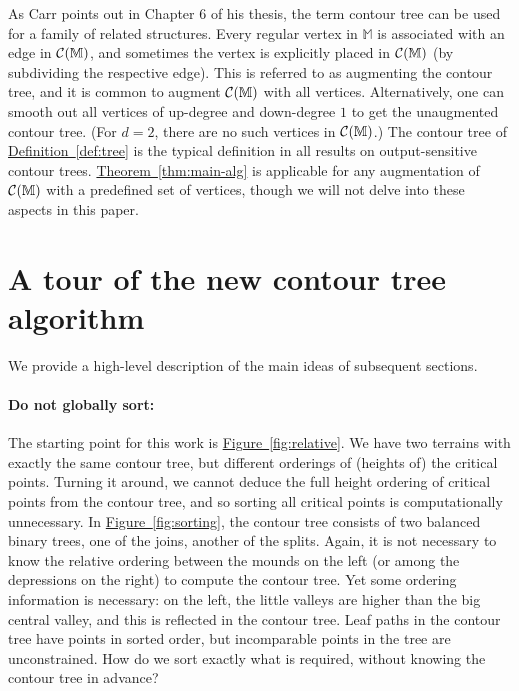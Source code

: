 \documentclass[11pt]{article}
\newcommand{\myparagraph}[1]{\paragraph{#1}}
\theoremstyle{definition}
\newcommand{\cC}{{\cal C}}
\newcommand{\MM}{\mathbb{M}}
\newcommand{\Fig}[1]{\hyperref[fig:#1]{Figure~\ref*{fig:#1}}} %
\newcommand{\Thm}[1]{\hyperref[thm:#1]{Theorem~\ref*{thm:#1}}} %
\newcommand{\Def}[1]{\hyperref[def:#1]{Definition~\ref*{def:#1}}} %
\newcommand{\reeb}{\cC}
\begin{document}
As Carr points out in Chapter 6 of his thesis, the term contour tree can be used for a family of related structures.
Every regular vertex in $\MM$ is associated with an edge in $\reeb(\MM)$, and sometimes the
vertex is explicitly placed in $\reeb(\MM)$ (by subdividing the respective edge). This is referred
to as augmenting the contour tree, and it is common to augment $\reeb(\MM)$ with all vertices.
Alternatively, one can smooth out all vertices of up-degree and down-degree $1$ to get the
unaugmented contour tree. (For $d=2$, there are no such vertices in $\reeb(\MM)$.) 
The contour tree of \Def{tree} is the typical definition in all results on output-sensitive
contour trees.
\Thm{main-alg} is applicable for any augmentation of $\reeb(\MM)$ with a predefined
set of vertices, though we will not delve into these aspects in this paper.



\section{A tour of the new contour tree algorithm} \label{sec:approach}
We provide a high-level description of the main ideas of subsequent sections.  

\myparagraph{Do not globally sort:} The starting point for this work is \Fig{relative}. We have two terrains
with exactly the same contour tree, but different orderings of (heights of) the critical points.
Turning it around, we cannot deduce the full height ordering of critical points from the contour tree, and so 
sorting all critical points is computationally unnecessary.
In \Fig{sorting}, the contour tree consists of two balanced binary trees, one of the joins,
another of the splits. Again, it is not necessary to know the relative ordering between the mounds
on the left (or among the depressions on the right) to compute the contour tree. Yet some ordering
information is necessary: on the left, the little valleys are higher than the big central valley,
and this is reflected in the contour tree. Leaf paths in the contour tree have points
in sorted order, but incomparable points in the tree are unconstrained.
How do we sort exactly what is required, without knowing the contour tree in advance?
\end{document}
